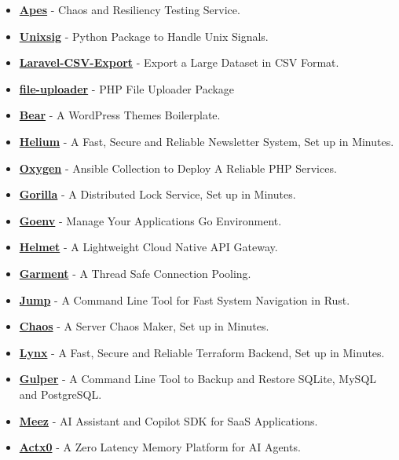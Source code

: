 \documentclass[paper=a4,fontsize=11pt]{scrartcl} %
\begin{document}
\begin{itemize}
\item \textbf{\href{https://github.com/Clivern/Apes}{Apes}} - Chaos and Resiliency Testing Service.
\item \textbf{\href{https://github.com/Clivern/Unixsig}{Unixsig}} - Python Package to Handle Unix Signals.
\item \textbf{\href{https://github.com/Clivern/Laravel-CSV-Export}{Laravel-CSV-Export}} - Export a Large Dataset in CSV Format.
\item \textbf{\href{https://github.com/Clivern/file_uploader}{file-uploader}} - PHP File Uploader Package
\item \textbf{\href{https://github.com/Clivern/Bear}{Bear}} - A WordPress Themes Boilerplate.
\item \textbf{\href{https://github.com/Clivernio/Helium}{Helium}} - A Fast, Secure and Reliable Newsletter System, Set up in Minutes.
\item \textbf{\href{https://github.com/Clivern/Oxygen}{Oxygen}} - Ansible Collection to Deploy A Reliable PHP Services.
\item \textbf{\href{https://github.com/Norwik/Gorilla}{Gorilla}} - A Distributed Lock Service, Set up in Minutes.
\item \textbf{\href{https://github.com/Clivern/Goenv}{Goenv}} - Manage Your Applications Go Environment.
\item \textbf{\href{https://github.com/Norwik/Helmet}{Helmet}} - A Lightweight Cloud Native API Gateway.
\item \textbf{\href{https://github.com/Norwik/Garment}{Garment}} - A Thread Safe Connection Pooling.
\item \textbf{\href{https://github.com/Clivern/Jump}{Jump}} - A Command Line Tool for Fast System Navigation in Rust.
\item \textbf{\href{https://github.com/Clivern/Chaos}{Chaos}} - A Server Chaos Maker, Set up in Minutes.
\item \textbf{\href{https://github.com/Clivern/Lynx}{Lynx}} - A Fast, Secure and Reliable Terraform Backend, Set up in Minutes.
\item \textbf{\href{https://github.com/Clivern/Gulper}{Gulper}} - A Command Line Tool to Backup and Restore SQLite, MySQL and PostgreSQL.
\item \textbf{\href{https://github.com/Clivern/Meez}{Meez}} - AI Assistant and Copilot SDK for SaaS Applications.
\item \textbf{\href{https://github.com/Actx0/Actx0}{Actx0}} - A Zero Latency Memory Platform for AI Agents.

\end{itemize}
\end{document}
